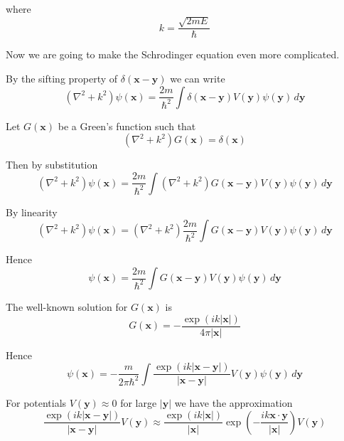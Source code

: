 where
\begin{equation*}
k=\frac{\sqrt{2mE}}{\hbar}
\end{equation*}

Now we are going to make the Schrodinger equation even more complicated.

\medskip
By the sifting property of $\delta(\mathbf x-\mathbf y)$ we can write
\begin{equation*}
\left(\nabla^2+k^2\right)\psi(\mathbf x)=\frac{2m}{\hbar^2}
\int\delta(\mathbf x-\mathbf y)V(\mathbf y)\psi(\mathbf y)\,d\mathbf y
\end{equation*}

Let $G(\mathbf x)$ be a Green's function such that
\begin{equation*}
\left(\nabla^2+k^2\right)G(\mathbf x)=\delta(\mathbf x)
\end{equation*}

Then by substitution
\begin{equation*}
\left(\nabla^2+k^2\right)\psi(\mathbf x)=\frac{2m}{\hbar^2}
\int\left(\nabla^2+k^2\right)G(\mathbf x-\mathbf y)V(\mathbf y)\psi(\mathbf y)\,d\mathbf y
\end{equation*}

By linearity
\begin{equation*}
\left(\nabla^2+k^2\right)\psi(\mathbf x)=\left(\nabla^2+k^2\right)\frac{2m}{\hbar^2}
\int G(\mathbf x-\mathbf y)V(\mathbf y)\psi(\mathbf y)\,d\mathbf y
\end{equation*}

Hence
\begin{equation*}
\psi(\mathbf x)=\frac{2m}{\hbar^2}
\int G(\mathbf x-\mathbf y)V(\mathbf y)\psi(\mathbf y)\,d\mathbf y
\end{equation*}

The well-known solution for $G(\mathbf x)$ is
\begin{equation*}
G(\mathbf x)=-\frac{\exp(ik|\mathbf x|)}{4\pi|\mathbf x|}
\end{equation*}

Hence
\begin{equation*}
\psi(\mathbf x)=-\frac{m}{2\pi\hbar^2}
\int\frac{\exp(ik|\mathbf x-\mathbf y|)}{|\mathbf x-\mathbf y|}V(\mathbf y)\psi(\mathbf y)\,d\mathbf y
\end{equation*}

For potentials $V(\mathbf y)\approx0$ for large $|\mathbf y|$ we have the approximation
\begin{equation*}
\frac{\exp(ik|\mathbf x-\mathbf y|)}{|\mathbf x-\mathbf y|}V(\mathbf y)
\approx\frac{\exp(ik|\mathbf x|)}{|\mathbf x|}
\exp\left(-\frac{ik\mathbf x\cdot\mathbf y}{|\mathbf x|}\right)V(\mathbf y)
\end{equation*}

